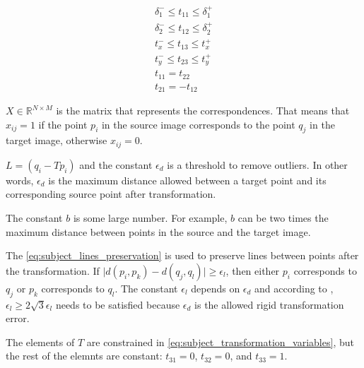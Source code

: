         \begin{equation}
            \label{eq:subject_transformation_variables}
            \begin{gathered}
                \delta_1^- \leq t_{11} \leq \delta_1^+ \\
                \delta_2^- \leq t_{12} \leq \delta_2^+ \\
                t_x^- \leq t_{13} \leq t_x^+ \\
                t_y^- \leq t_{23} \leq t_y^+ \\
                t_{11} = t_{22} \\
                t_{21} = -t_{12}
            \end{gathered}
        \end{equation}
        

        $X \in \mathbb{R}^{N \times M}$ is the matrix that represents the correspondences.
        That means that $x_{ij} = 1$ if the point $p_i$ in the source image corresponds to the point $q_j$ in the target image, otherwise $x_{ij} = 0$.

        $L = (q_i - T p_i)$ and the constant $\epsilon_d$ is a threshold to remove outliers. 
        In other words, $\epsilon_d$ is the maximum distance allowed between a target point and its corresponding source point after transformation.

        The constant $b$ is some large number. For example, $b$ can be two times the maximum distance between points in the source and the target image.

        The \autoref{eq:subject_lines_preservation} is used to preserve lines between points after the transformation.
        If $\mid d(p_i, p_k) - d(q_j, q_l) \mid \geq \epsilon_l$, then either $p_i$ corresponds to $q_j$ or $p_k$ corresponds to $q_l$.
        The constant $\epsilon_l$ depends on $\epsilon_d$ and according to \cite{Sakakubara_2007_automatic}, 
        $\epsilon_l \geq 2 \sqrt{3} \epsilon_l$ needs to be satisfied because $\epsilon_d$ is the allowed rigid transformation error.

        The elements of $T$ are constrained in \autoref{eq:subject_transformation_variables},
        but the rest of the elemnts are constant: $t_{31} = 0$, $t_{32} = 0$, and $t_{33} = 1$.
        
          

